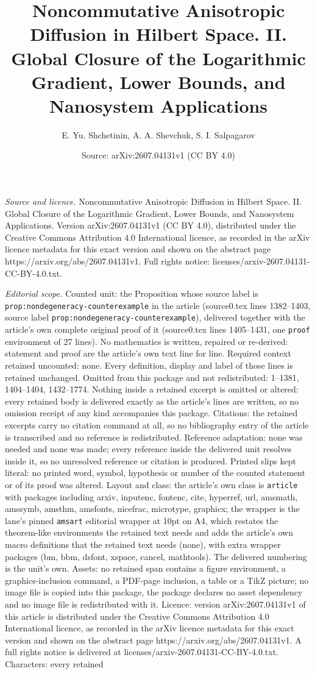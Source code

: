 \documentclass[10pt,a4paper]{amsart}
\title[Noncommutative Anisotropic Diffusion in Hilbert Space. II. G]{Noncommutative Anisotropic Diffusion in Hilbert Space. II. Global Closure of the Logarithmic Gradient, Lower Bounds, and Nanosystem Applications}
\author{E. Yu. Shchetinin, A. A. Shevchuk, S. I. Salpagarov}
\date{Source: arXiv:2607.04131v1 (CC BY 4.0)}
\begin{document}
\maketitle

\noindent\emph{Source and licence.} Noncommutative Anisotropic Diffusion in Hilbert Space. II. Global Closure of the Logarithmic Gradient, Lower Bounds, and Nanosystem Applications. Version arXiv:2607.04131v1 (CC BY 4.0), distributed under the Creative Commons Attribution 4.0 International licence, as recorded in the arXiv licence metadata for this exact version and shown on the abstract page https://arxiv.org/abs/2607.04131v1. Full rights notice: licenses/arxiv-2607.04131-CC-BY-4.0.txt.\par\smallskip

\noindent\textit{Editorial scope.} Counted unit: the Proposition whose source label is \texttt{prop:nondegeneracy-counterexample} in the article (source0.tex lines 1382--1403, source label \texttt{prop:nondegeneracy-counterexample}), delivered together with the article's own complete original proof of it (source0.tex lines 1405--1431, one \texttt{proof} environment of 27 lines). No mathematics is written, repaired or re-derived: statement and proof are the article's own text line for line. Required context retained uncounted: none. Every definition, display and label of those lines is retained unchanged. Omitted from this package and not redistributed: 1--1381, 1404--1404, 1432--1774. Nothing inside a retained excerpt is omitted or altered: every retained body is delivered exactly as the article's lines are written, so no omission receipt of any kind accompanies this package. Citations: the retained excerpts carry no citation command at all, so no bibliography entry of the article is transcribed and no reference is redistributed. Reference adaptation: none was needed and none was made; every reference inside the delivered unit resolves inside it, so no unresolved reference or citation is produced. Printed slips kept literal: no printed word, symbol, hypothesis or number of the counted statement or of its proof was altered. Layout and class: the article's own class is \texttt{article} with packages including arxiv, inputenc, fontenc, cite, hyperref, url, amsmath, amssymb, amsthm, amsfonts, nicefrac, microtype, graphicx; the wrapper is the lane's pinned \texttt{amsart} editorial wrapper at 10pt on A4, which restates the theorem-like environments the retained text needs and adds the article's own macro definitions that the retained text needs (none), with extra wrapper packages (bm, bbm, dsfont, xspace, cancel, mathtools). The delivered numbering is the unit's own. Assets: no retained span contains a figure environment, a graphics-inclusion command, a PDF-page inclusion, a table or a TikZ picture; no image file is copied into this package, the package declares no asset dependency and no image file is redistributed with it. Licence: version arXiv:2607.04131v1 of this article is distributed under the Creative Commons Attribution 4.0 International licence, as recorded in the arXiv licence metadata for this exact version and shown on the abstract page https://arxiv.org/abs/2607.04131v1. A full rights notice is delivered at licenses/arxiv-2607.04131-CC-BY-4.0.txt. Characters: every retained 
\end{document}
